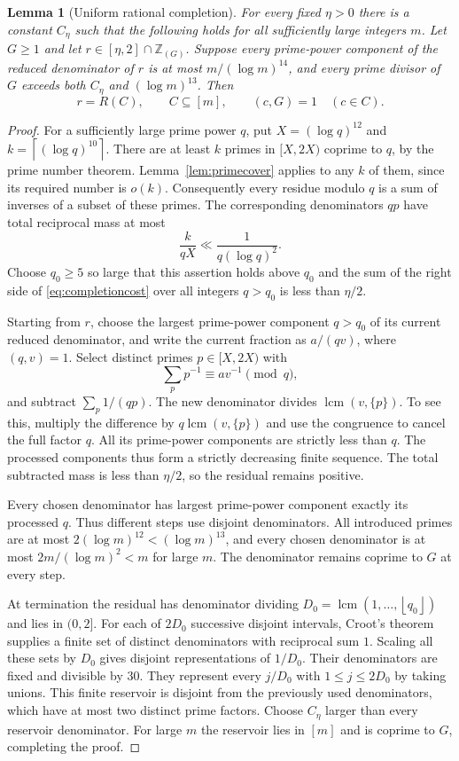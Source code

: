 \documentclass[11pt,leqno]{amsart}
\numberwithin{equation}{section}
\newtheorem{lemma}[theorem]{Lemma}
\theoremstyle{definition}
\theoremstyle{remark}
\newcommand{\Z}{\mathbb Z}
\newcommand{\lcm}{\operatorname{lcm}}
\newcommand{\floor}[1]{\left\lfloor #1\right\rfloor}
\newcommand{\ceil}[1]{\left\lceil #1\right\rceil}
\begin{document}
\begin{lemma}[Uniform rational completion]\label{lem:completion}
For every fixed $\eta>0$ there is a constant $C_\eta$ such that the
following holds for all sufficiently large integers $m$.
Let $G\ge1$ and let $r\in[\eta,2]\cap\Z_{(G)}$. Suppose every
prime-power component of the reduced denominator of $r$ is at most
$m/(\log m)^{14}$, and every prime divisor of $G$ exceeds both $C_\eta$
and $(\log m)^{13}$. Then
\[
 r=R(C),\qquad C\subseteq[m],\qquad (c,G)=1\quad(c\in C).
\]
\end{lemma}

\begin{proof}
For a sufficiently large prime power $q$, put $X=(\log q)^{12}$ and
$k=\ceil{(\log q)^{10}}$. There are at least $k$ primes in $[X,2X)$
coprime to $q$, by the prime number theorem. Lemma~\ref{lem:primecover}
applies to any $k$ of them, since its required number is $o(k)$.
Consequently every residue modulo $q$ is a sum of inverses of a subset
of these primes. The corresponding denominators $qp$ have total
reciprocal mass at most
\begin{equation}\label{eq:completioncost}
 \frac{k}{qX}\ll\frac1{q(\log q)^2}.
\end{equation}
Choose $q_0\ge5$ so large that this assertion holds above $q_0$ and the
sum of the right side of \eqref{eq:completioncost} over all integers
$q>q_0$ is less than $\eta/2$.

Starting from $r$, choose the largest prime-power component $q>q_0$ of
its current reduced denominator, and write the current fraction as
$a/(qv)$, where $(q,v)=1$. Select distinct primes $p\in[X,2X)$ with
\[
 \sum_p p^{-1}\equiv av^{-1}\pmod q,
\]
and subtract $\sum_p1/(qp)$. The new denominator divides
$\lcm(v,\{p\})$. To see this, multiply the difference by
$q\lcm(v,\{p\})$ and use the congruence to cancel the full factor $q$.
All its prime-power components are strictly less than $q$.
The processed components thus form a strictly decreasing finite sequence.
The total subtracted mass is less than $\eta/2$, so the residual remains
positive.

Every chosen denominator has largest prime-power component exactly its
processed $q$. Thus different steps use disjoint denominators.
All introduced primes are at most $2(\log m)^{12}< (\log m)^{13}$, and
every chosen denominator is at most
$2m/(\log m)^2<m$ for large $m$. The denominator remains coprime to $G$
at every step.

At termination the residual has denominator dividing
$D_0=\lcm(1,\ldots,\floor{q_0})$ and lies in $(0,2]$.
For each of $2D_0$ successive disjoint intervals, Croot's theorem
\cite{Croot} supplies a finite set of distinct denominators with
reciprocal sum $1$. Scaling all these sets by $D_0$ gives disjoint
representations of $1/D_0$. Their denominators are fixed and divisible
by $30$. They represent every $j/D_0$ with $1\le j\le2D_0$ by taking
unions. This finite reservoir is disjoint from the previously used
denominators, which have at most two distinct prime factors.
Choose $C_\eta$ larger than every reservoir denominator. For large $m$
the reservoir lies in $[m]$ and is coprime to $G$, completing the proof.
\end{proof}
\end{document}
